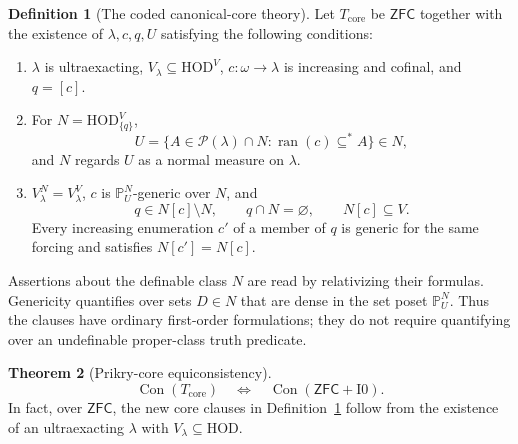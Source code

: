 \documentclass[11pt,letterpaper]{article}
\theoremstyle{definition}
\newtheorem{definition}{Definition}[section]
\newtheorem{theorem}[definition]{Theorem}
\newcommand{\ZFC}{\mathsf{ZFC}}
\newcommand{\HOD}{\mathrm{HOD}}
\newcommand{\Con}{\operatorname{Con}}
\newcommand{\ran}{\operatorname{ran}}
\newcommand{\Pow}{\mathcal P}
\newcommand{\PP}{\mathbb P}
\newcommand{\Izero}{\mathrm I0}
\begin{document}
\begin{definition}[The coded canonical-core theory]\label{def:Tcore}
Let $T_{\mathrm{core}}$ be $\ZFC$ together with the existence of $\lambda,c,q,U$ satisfying the following conditions:
\begin{enumerate}
\item $\lambda$ is ultraexacting, $V_\lambda\subseteq\HOD^V$, $c:\omega\to\lambda$ is increasing and cofinal, and $q=[c]$.
\item For $N=\HOD_{\{q\}}^V$,
\[
 U=\{A\in\Pow(\lambda)\cap N:\ran(c)\subseteq^* A\}\in N,
\]
and $N$ regards $U$ as a normal measure on $\lambda$.
\item $V_\lambda^N=V_\lambda^V$, $c$ is $\PP_U^N$-generic over $N$, and
\[
        q\in N[c]\setminus N,\qquad q\cap N=\varnothing,
        \qquad N[c]\subseteq V.
\]
Every increasing enumeration $c'$ of a member of $q$ is generic for the same forcing and satisfies $N[c']=N[c]$.
\end{enumerate}
Assertions about the definable class $N$ are read by relativizing their formulas. Genericity quantifies over sets $D\in N$ that are dense in the set poset $\PP_U^N$. Thus the clauses have ordinary first-order formulations; they do not require quantifying over an undefinable proper-class truth predicate.
\end{definition}

\begin{theorem}[Prikry-core equiconsistency]\label{thm:equicons}
\[
                         \boxed{\quad
       \Con(T_{\mathrm{core}})\quad\Longleftrightarrow\quad
                          \Con(\ZFC+\Izero).
                         \quad}
\]
In fact, over $\ZFC$, the new core clauses in Definition~\ref{def:Tcore} follow from the existence of an ultraexacting $\lambda$ with $V_\lambda\subseteq\HOD$.
\end{theorem}
\end{document}

